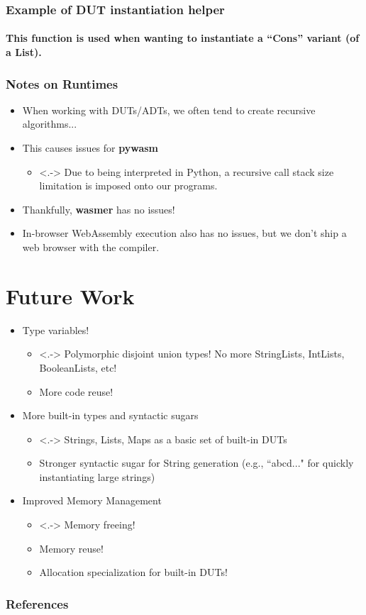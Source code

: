 \documentclass{beamer}
\begin{document}
\begin{frame}
 \frametitle{Example of DUT instantiation helper}
 \framesubtitle{This function is used when wanting to instantiate a ``Cons'' variant (of a List).}
 \usebox{\exampleInstantiationHelper}
\end{frame}


\begin{frame}
\frametitle{Notes on Runtimes}
\begin{itemize}
    \item<1-> When working with DUTs/ADTs, we often tend to create recursive algorithms...
    \item<2-> This causes issues for \textbf{pywasm}
    \begin{itemize}
     \item <.-> Due to being interpreted in Python, a recursive call stack size limitation is imposed onto our programs.
    \end{itemize}

    \item<3-> Thankfully, \textbf{wasmer} has no issues!
    \item<4-> In-browser WebAssembly execution also has no issues, but we don't ship a web browser with the compiler.
\end{itemize}
\end{frame}

\section{Future Work}

\begin{frame}

\begin{itemize}
 \item<1-> Type variables!
 \begin{itemize}
  \item<.-> Polymorphic disjoint union types! No more StringLists, IntLists, BooleanLists, etc!
  \item More code reuse!
 \end{itemize}
 
 \item<2-> More built-in types and syntactic sugars
 \begin{itemize}
 \item<.-> Strings, Lists, Maps as a basic set of built-in DUTs
 \item Stronger syntactic sugar for String generation (e.g., ``abcd..." for quickly instantiating large strings)
 \end{itemize}
 
 \item<3-> Improved Memory Management
 \begin{itemize}
  \item<.-> Memory freeing!
  \item Memory reuse!
  \item Allocation specialization for built-in DUTs!
 \end{itemize}

\end{itemize}

\end{frame}

\begin{frame}
\frametitle{References}
\end{frame}
\end{document}
